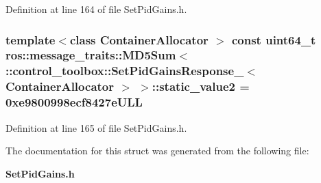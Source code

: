 \-Definition at line 164 of file \-Set\-Pid\-Gains.\-h.

\subsubsection[{static\-\_\-value2}]{\setlength{\rightskip}{0pt plus 5cm}template$<$class Container\-Allocator $>$ const uint64\-\_\-t ros\-::message\-\_\-traits\-::\-M\-D5\-Sum$<$ \-::{\bf control\-\_\-toolbox\-::\-Set\-Pid\-Gains\-Response\-\_\-}$<$ \-Container\-Allocator $>$ $>$\-::{\bf static\-\_\-value2} = 0xe9800998ecf8427e\-U\-L\-L\hspace{0.3cm}{\ttfamily  [static]}}\label{structros_1_1message__traits_1_1MD5Sum_3_01_1_1control__toolbox_1_1SetPidGainsResponse___3_01ContainerAllocator_01_4_01_4_a53384cbe8d15c52849c628b2ca660ec3}


\-Definition at line 165 of file \-Set\-Pid\-Gains.\-h.



\-The documentation for this struct was generated from the following file\-:\begin{DoxyCompactItemize}
\item 
{\bf \-Set\-Pid\-Gains.\-h}\end{DoxyCompactItemize}
